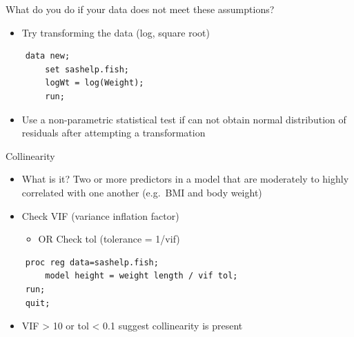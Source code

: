 \documentclass[ignorenonframetext,xcolor=dvipsnames]{beamer}
\begin{document}
\begin{frame}[fragile]{What do you do if your data does not meet these
assumptions?}

\begin{itemize}[<+->]
\itemsep1pt\parskip0pt
\item
  Try transforming the data (log, square root)
\end{itemize}

\begin{verbatim}
    data new;
        set sashelp.fish;
        logWt = log(Weight);
        run;
\end{verbatim}

\begin{itemize}[<+->]
\itemsep1pt\parskip0pt
\item
  Use a non-parametric statistical test if can not obtain normal
  distribution of residuals after attempting a transformation
\end{itemize}

\end{frame}

\begin{frame}[fragile]{Collinearity}

\begin{itemize}
\itemsep1pt\parskip0pt
\item
  What is it? Two or more predictors in a model that are moderately to
  highly correlated with one another (e.g.~BMI and body weight)
\end{itemize}

\pause

\begin{itemize}
\itemsep1pt\parskip0pt
\item
  Check VIF (variance inflation factor)

  \begin{itemize}
  \itemsep1pt\parskip0pt
  \item
    OR Check tol (tolerance = 1/vif)
  \end{itemize}
\end{itemize}

\begin{verbatim}
    proc reg data=sashelp.fish;
        model height = weight length / vif tol;
    run;
    quit;
\end{verbatim}

\begin{itemize}
\itemsep1pt\parskip0pt
\item
  VIF \textgreater{} 10 or tol \textless{} 0.1 suggest collinearity is
  present
\end{itemize}

\end{frame}
\end{document}
